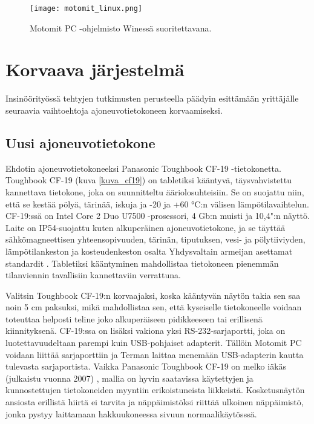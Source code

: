 \begin{figure}[H]
\centering
\texttt{[image: motomit\_linux.png]}
\caption{Motomit PC -ohjelmisto Winessä suoritettavana.}
\label{wine_motomit}
\end{figure}


\newpage

\chapter{Korvaava järjestelmä}
\label{ch:korvaava_jarjestelma}
Insinöörityössä tehtyjen tutkimusten perusteella päädyin esittämään yrittäjälle seuraavia vaihtoehtoja ajoneuvotietokoneen korvaamiseksi.

\section{Uusi ajoneuvotietokone}
Ehdotin ajoneuvotietokoneeksi Panasonic Toughbook CF-19 -tietokonetta. Toughbook CF-19 (kuva \ref{kuva_cf19}) on tabletiksi kääntyvä, täysvahvistettu kannettava tietokone, joka on suunnitteltu ääriolosuhteisiin. Se on suojattu niin, että se kestää pölyä, tärinää, iskuja ja -20 ja +60 °C:n välisen lämpötilavaihtelun. CF-19:ssä on Intel Core 2 Duo U7500 -prosessori, 4 Gb:n muisti ja 10,4":n näyttö. Laite on IP54-suojattu kuten alkuperäinen ajoneuvotietokone, ja se täyttää sähkömagneettisen yhteensopivuuden, tärinän, tiputuksen, vesi- ja pölytiiviyden, lämpötilankeston ja kosteudenkeston osalta Yhdysvaltain armeijan asettamat standardit \cite{cf19}. Tabletiksi kääntyminen mahdollistaa tietokoneen pienemmän tilanviennin tavallisiin kannettaviin verrattuna.

Valitsin Toughbook CF-19:n korvaajaksi, koska kääntyvän näytön takia sen saa noin 5 cm paksuksi, mikä mahdollistaa sen, että kyseiselle tietokoneelle voidaan toteuttaa helposti teline joko alkuperäiseen pidikkeeseen tai erillisenä kiinnityksenä. CF-19:ssa on lisäksi vakiona yksi RS-232-sarjaportti, joka on luotettavuudeltaan parempi kuin USB-pohjaiset adapterit. Tällöin Motomit PC voidaan liittää sarjaporttiin ja Terman laittaa menemään USB-adapterin kautta tulevasta sarjaportista. Vaikka Panasonic Toughbook CF-19 on melko iäkäs (julkaistu vuonna 2007) \cite{cf19}, mallia on hyvin saatavissa käytettyjen ja kunnostettujen tietokoneiden myyntiin erikoistuneista liikkeistä. Kosketusnäytön ansiosta erillistä hiirtä ei tarvita ja näppäimistöksi riittää ulkoinen näppäimistö, jonka pystyy laittamaan hakkuukoneessa sivuun normaalikäytösssä.

